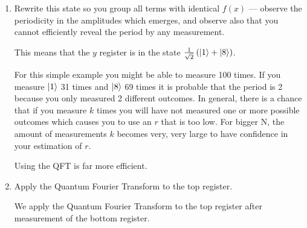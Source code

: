 \documentclass[12pt]{article}
\newcommand{\rsqrt}[1]{\ensuremath{\frac{1}{\sqrt{#1}}}}
\newenvironment{answer}{\begingroup\setlength{\leftskip}{-\leftmargin}\begin{framed}}{\end{framed}\endgroup}
\begin{document}
\begin{enumerate}
    \item Rewrite this state so you group all terms with identical $f(x)$ — observe the periodicity in the amplitudes which emerges, and observe also that you cannot efficiently reveal the period by any measurement.

    \begin{answer}
       	This means that the $y$ register is in the state $\rsqrt{2}\left(\ket{1} + \ket{8}\right)$.

       	For this simple example you might be able to measure 100 times. If you measure $\ket{1}$ 31 times and $\ket{8}$ 69 times it is probable that the period is 2 because you only measured 2 different outcomes. In general, there is a chance that if you measure $k$ times you will have not measured one or more possible outcomes which causes you to use an $r$ that is too low. For bigger N, the amount of measurements $k$ becomes very, very large to have confidence in your estimation of $r$.

       	Using the QFT is far more efficient.
    \end{answer}

    \item Apply the Quantum Fourier Transform to the top register.

    \begin{answer}
    	We apply the Quantum Fourier Transform to the top register after measurement of the bottom register.


\end{answer}
\end{enumerate}
\end{document}

